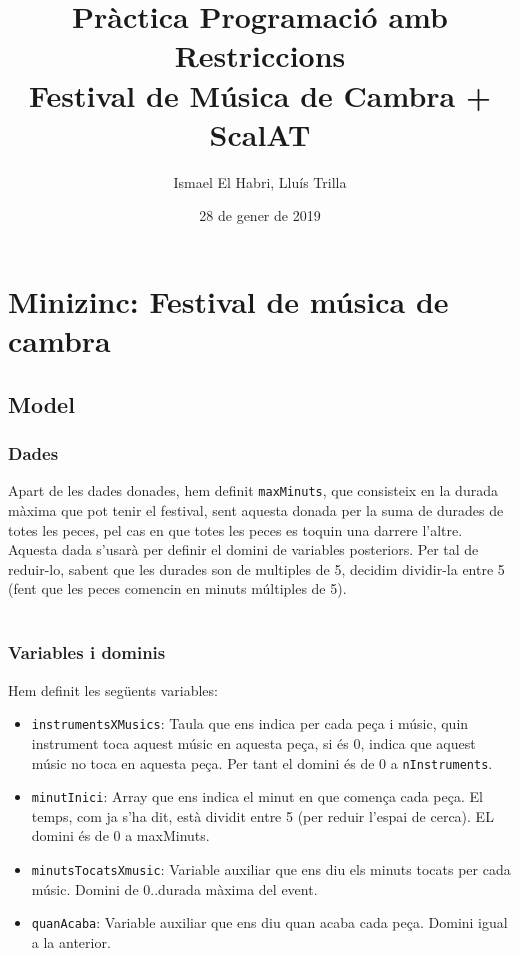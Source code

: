 \documentclass[11pt,a4paper,twoside]{report}
\begin{document}
\title{Pràctica Programació amb Restriccions \\
\large Festival de Música de Cambra + ScalAT }
\author{Ismael El Habri, Lluís Trilla}
\date{28 de gener de 2019}
\maketitle

\tableofcontents

\chapter{Minizinc: Festival de música de cambra }

\section{Model}

\subsection{Dades}
Apart de les dades donades, hem definit \texttt{maxMinuts}, que consisteix en la durada màxima que pot tenir el festival, sent aquesta donada per la suma de durades de totes les peces, pel cas en que totes les peces es toquin una darrere l'altre.
Aquesta dada s'usarà per definir el domini de variables posteriors. Per tal de reduir-lo, sabent que les durades son de multiples de 5, decidim dividir-la entre 5 (fent que les peces comencin en minuts múltiples de 5).
\\~\\


\subsection{Variables i dominis}

Hem definit les següents variables:

\begin{itemize}
    \item \texttt{instrumentsXMusics}: Taula que ens indica per cada peça i músic, quin instrument toca aquest músic en aquesta peça, si és 0, indica que aquest músic no toca en aquesta peça. Per tant el domini és de 0 a \texttt{nInstruments}.
    \item \texttt{minutInici}: Array que ens indica el minut en que comença cada peça. El temps, com ja s'ha dit, està dividit entre 5 (per reduir l'espai de cerca). EL domini és de 0 a maxMinuts.
    \item \texttt{minutsTocatsXmusic}: Variable auxiliar que ens diu els minuts tocats per cada músic. Domini de 0..durada màxima del event.
    \item \texttt{quanAcaba}: Variable auxiliar que ens diu quan acaba cada peça. Domini igual a la anterior.
\end{itemize}
\end{document}
